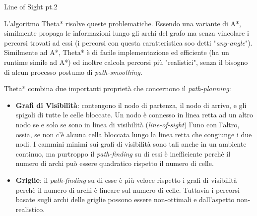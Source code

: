 \documentclass[11pt]{book}
\begin{document}
\begin{algorithm}
\PrintSemicolon
{}
\caption{Line of Sight pt.2}
  \LinesNumbered
  \setcounter{AlgoLine}{41}
 \end{algorithm}

\par{
L'algoritmo Theta* risolve queste problematiche. Essendo una variante di A*, similmente propaga le informazioni lungo gli archi del grafo ma senza vincolare i percorsi trovati ad essi (i percorsi con questa caratteristica soo detti "\emph{any-angle}"). 
Similmente ad A*, Theta* \`e di facile implementazione ed efficiente (ha un runtime simile ad A*) ed inoltre calcola percorsi pi\`u "realistici", senza il bisogno di alcun processo postumo di \emph{path-smoothing.} 
}
\par{
Theta* combina due importanti propriet\`a che concernono il \emph{path-planning}: 


\begin{itemize}
\item \textbf{Grafi di Visibilit\`a}: contengono il nodo di partenza, il nodo di arrivo, e gli spigoli di tutte le celle bloccate. Un nodo \`e connesso in linea retta ad un altro nodo se e solo se sono in linea di visibilit\`a (\emph{line-of-sight}) l'uno con l'altro, ossia, se non c'\`e alcuna cella bloccata lungo la linea retta che congiunge i due nodi. I cammini minimi sui grafi di visibilit\`a sono tali anche in un ambiente continuo, ma purtroppo il \emph{path-finding} su di essi \`e inefficiente perch\`e il numero di archi pu\`o essere quadratico rispetto il numero di celle.
\item \textbf{Griglie}: il \emph{path-finding} su di esse \`e pi\`u veloce rispetto i grafi di visibilit\`a perch\`e il numero di archi \`e lineare sul numero di celle. Tuttavia i percorsi basate sugli archi delle griglie possono essere non-ottimali e dall'aspetto non-realistico.
\end{itemize}}
\end{document}
